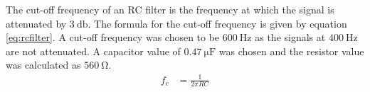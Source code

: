 The cut-off frequency of an RC filter is the frequency at which the signal is attenuated by $\SI{3}{\decibel}$.
The formula for the cut-off frequency is given by equation \ref{eq:rcfilter}.
A cut-off frequency was chosen to be $\SI{600}{\hertz}$ as the signals at $\SI{400}{\hertz}$ are not attenuated.
A capacitor value of $\SI{0.47}{\micro\farad}$ was chosen and the resistor value was calculated as $\SI{560}{\ohm}$.
\begin{align}
	f_c &= \frac{1}{2 \pi R C} \label{eq:rcfilter}
\end{align}


